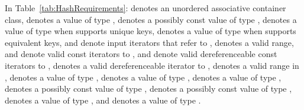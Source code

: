 \pnum
{}%
%
%
%
%
%
In Table~\ref{tab:HashRequirements}:
 denotes an unordered associative container class,
 denotes a value of type ,
 denotes a possibly const value of type ,
 denotes a value of type  when  supports unique keys,
 denotes a value of type  when  supports equivalent keys,
 and  denote input iterators that refer to ,
\tcode{[i, j)} denotes a valid range,
 and  denote valid const iterators to ,
 and  denote valid dereferenceable const iterators to ,
 denotes a valid dereferenceable iterator to ,
\tcode{[q1, q2)} denotes a valid range in ,
 denotes a value of type ,
 denotes a value of type ,
 denotes a value of type ,
 denotes a possibly const value of type ,
 denotes a possibly const value of type ,
 denotes a value of type ,
and  denotes a value of type .

